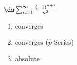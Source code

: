 {$\ds \sum_{n=1}^\infty \frac{(-1)^{n+1}}{n^2}$
}
{\begin{enumerate}
	\item converges
	\item	converges ($p$-Series)
	\item absolute
\end{enumerate}
}
